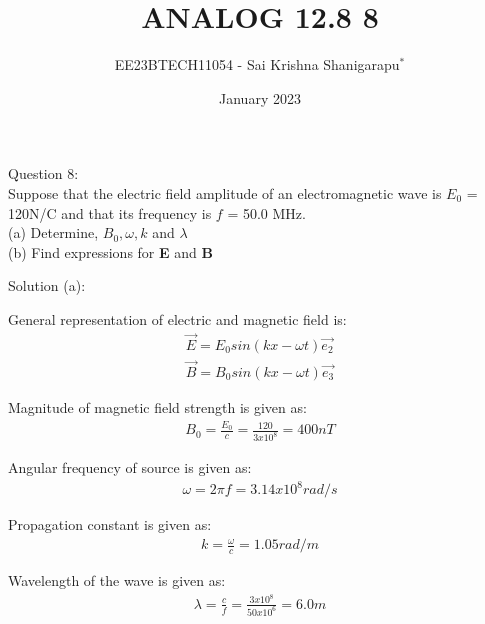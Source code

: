 \documentclass[journal,12pt,twocolumn]{IEEEtran}
\theoremstyle{remark}
\begin{document}

\vspace{3cm}

\title{ANALOG 12.8 8}
\author{EE23BTECH11054 - Sai Krishna Shanigarapu$^{*}$%
}
\date{January 2023}
\maketitle
\newpage
\bigskip

\begin{flushleft}
Question 8:\\
Suppose that the electric field amplitude of an electromagnetic wave is $E_0$ = 120N/C and that its frequency is $f$ = 50.0 MHz.\\
(a) Determine, $B_0, \omega, k$ and $\lambda$\\
(b) Find expressions for \textbf{E} and \textbf{B}\\
\end{flushleft}

\bigskip

\begin{flushleft}
Solution (a):\\
\begin{flushleft}
    \begin{table}[h]
	
   \end{table}
   General representation of electric and magnetic field is:\\
   \begin{align}
   \vec{E} = E_0sin(kx - \omega t)\vec{e_2}\\
   \vec{B} = B_0sin(kx - \omega t)\vec{e_3}
   \end{align}
   
   
   
\end{flushleft}
Magnitude of magnetic field strength is given as: \\
\begin{align}
    B_0 = \frac{E_0}{c} = \frac{120}{3 x 10^8} = 400nT
\end{align}

Angular frequency of source is given as:
\begin{align}
    \omega = 2\pi f = 3.14 x 10^8 rad/s
\end{align}

Propagation constant is given as:
\begin{align}
     k = \frac{\omega}{c} = 1.05 rad/m
\end{align}

Wavelength of the wave is given as:
\begin{align}
    \lambda = \frac{c}{f} = \frac{3 x 10^8}{50 x 10^6} = 6.0m    
\end{align}

\end{flushleft}
\end{document}

